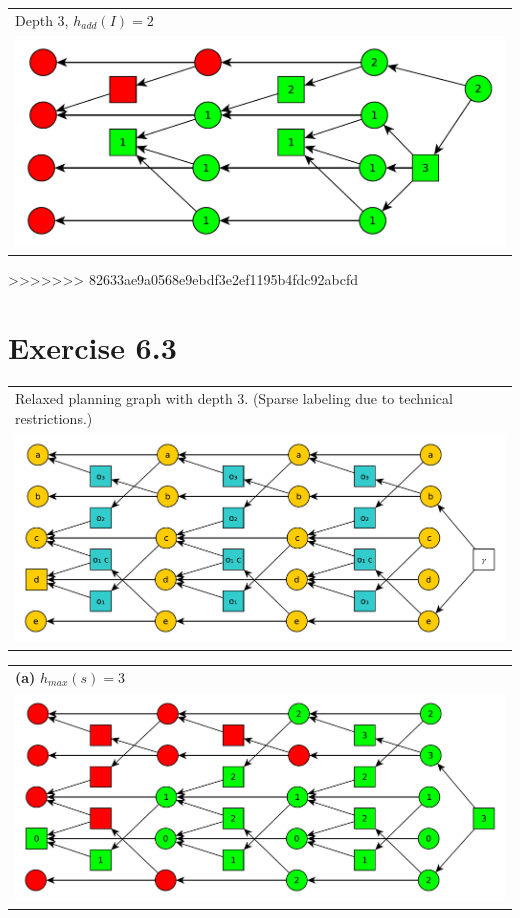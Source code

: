 \documentclass[11pt,a4paper]{article}
\begin{document}
\begin{tabular}{l} %
Depth 3, $h_{add}(I)=2$\\
\includegraphics[scale=0.5]{g621}\\
\end{tabular}
>>>>>>> 82633ae9a0568e9ebdf3e2ef1195b4fdc92abcfd

\section*{Exercise 6.3}
\begin{tabular}{l} %
Relaxed planning graph with depth 3. (Sparse labeling due to technical restrictions.)\\
\includegraphics[scale=0.5]{g63}\\
\end{tabular}

\begin{tabular}{l} %
\textbf{(a)} $h_{max}(s)=3$\\
\includegraphics[scale=0.5]{g63a}\\
\end{tabular}
\end{document}
